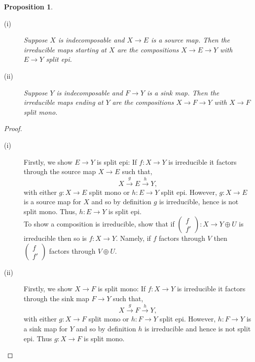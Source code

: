 \documentclass[11.5pt, twoside, a4paper, titlepage]{report}
\theoremstyle{definition}
\theoremstyle{plain}
\newtheorem{prop}[mydef]{Proposition}
\begin{document}
\begin{prop}
\begin{description}
\item [(i)] Suppose $X$ is indecomposable and $ X \to E$ is a source map. Then the irreducible maps starting at $X$ are the compositions $X \to E \to Y$ with $E \to Y$ split epi.
\item [(ii)] Suppose $Y$ is indecomposable and $F \to Y$ is a sink map. Then the irreducible maps ending at $Y$ are the compositions $X \to F \to Y$ with $X \to F$ split mono.
\end{description}
\end{prop}
\begin{proof}
\begin{description}
\item [(i)] Firstly, we show $E \to Y$ is split epi: If $f: X \to Y$ is irreducible it factors through the source map $X \to E$ such that,
\begin{equation*}
X \xrightarrow{g} E \xrightarrow{h} Y,
\end{equation*}
with either $g: X \to E$ split mono or $h: E \to Y$ split epi. However, $g: X \to E$ is a source map for $X$ and so by definition $g$ is irreducible, hence is not split mono. Thus, $h: E \to Y$ is split epi. \\
To show a composition is irreducible, show that if $(\begin{smallmatrix} f \\ f' \end{smallmatrix}): X \to Y \oplus U$ is irreducible then so is $f: X \to Y$. Namely, if $f$ factors through $V$ then $(\begin{smallmatrix} f\\f' \end{smallmatrix})$ factors through $V \oplus U$.
\item [(ii)] Firstly, we show $X \to F$ is split mono: If $f: X \to Y$ is irreducible it factors through the sink map $F \to Y$ such that,
\begin{equation*}
X \xrightarrow{g} F \xrightarrow{h} Y,
\end{equation*}
with either $g: X \to F$ split mono or $h: F \to Y$ split epi. However, $h: F \to Y$ is a sink map for $Y$ and so by definition $h$ is irreducible and hence is not split epi. Thus $g: X \to F$ is split mono.\\
\end{description}
\end{proof}
\end{document}
